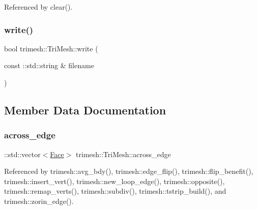 Referenced by clear().

\mbox{\label{classtrimesh_1_1TriMesh_aa9dd50ce8dcc13a09f5f7bdf535db68c}} 
\subsubsection{\texorpdfstring{write()}{write()}\hspace{0.1cm}{\footnotesize\ttfamily [2/2]}}
{\footnotesize\ttfamily bool trimesh\+::\+Tri\+Mesh\+::write (\begin{DoxyParamCaption}\item[{const \+::std\+::string \&}]{filename }\end{DoxyParamCaption})}



\subsection{Member Data Documentation}
\mbox{\label{classtrimesh_1_1TriMesh_a06884cdb2753f6aa878c8b0ab21ff27f}} 
\subsubsection{\texorpdfstring{across\+\_\+edge}{across\_edge}}
{\footnotesize\ttfamily \+::std\+::vector$<$\hyperlink{classtrimesh_1_1TriMesh_a06cb64bb6435d5cf4d7b24d2950fe8e7}{Face}$>$ trimesh\+::\+Tri\+Mesh\+::across\+\_\+edge}



Referenced by trimesh\+::avg\+\_\+bdy(), trimesh\+::edge\+\_\+flip(), trimesh\+::flip\+\_\+benefit(), trimesh\+::insert\+\_\+vert(), trimesh\+::new\+\_\+loop\+\_\+edge(), trimesh\+::opposite(), trimesh\+::remap\+\_\+verts(), trimesh\+::subdiv(), trimesh\+::tstrip\+\_\+build(), and trimesh\+::zorin\+\_\+edge().

\mbox{\label{classtrimesh_1_1TriMesh_a6411fb17ca70e0ecfa8c936c9ae9427c}} 
